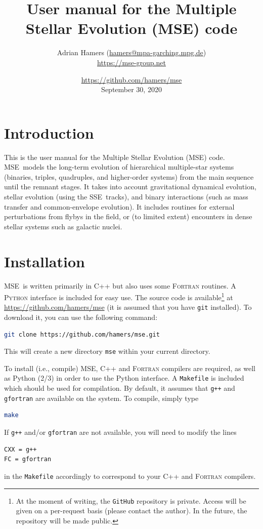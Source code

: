 \documentclass[a4paper,11pt]{article}
\title{User manual for the Multiple Stellar Evolution (MSE) code}
\author{Adrian Hamers (\url{hamers@mpa-garching.mpg.de})\\\url{https://mse-group.net}}
\date{\url{https://github.com/hamers/mse} \\ September 30, 2020}
\newcommand{\sse}{\textsc{SSE}}
\newcommand{\mse}{\textsc{MSE}}
\begin{document}
\maketitle


\tableofcontents
\clearpage

\section{Introduction}
This is the user manual for the Multiple Stellar Evolution (\mse) code. \mse~models the long-term evolution of hierarchical multiple-star systems (binaries, triples, quadruples, and higher-order systems) from the main sequence until  the remnant stages. It takes into account gravitational dynamical evolution, stellar evolution (using the \sse~tracks), and binary interactions (such as mass transfer and common-envelope evolution). It includes routines for external perturbations from flybys in the field, or (to limited extent) encounters in dense stellar systems such as galactic nuclei.


\section{Installation}
\mse~is written primarily in \textsc{C++} but also uses some \textsc{Fortran} routines. A \textsc{Python} interface is included for easy use. The source code is available\footnote{At the moment of writing, the \texttt{GitHub} repository is private. Access will be given on a per-request basis (please contact the author). In the future, the repository will be made public.} at \href{https://github.com/hamers/mse}{https://github.com/hamers/mse} (it is assumed that you have \texttt{git} installed). To download it, you can use the following command:
\begin{lstlisting}[caption={},label={code:wrap},language=bash]
git clone https://github.com/hamers/mse.git
\end{lstlisting}
This will create a new directory \texttt{mse} within your current directory. 

To install (i.e., compile) \mse, \textsc{C++} and \textsc{Fortran} compilers are required, as well as Python (2/3) in order to use the Python interface. A \texttt{Makefile} is included which should be used for compilation. By default, it assumes that \texttt{g++} and \texttt{gfortran} are available on the system. To compile, simply type
\begin{lstlisting}[caption={},label={code:wrap},language=bash]
make
\end{lstlisting}
If \texttt{g++} and/or \texttt{gfortran} are not available, you will need to modify the lines
\begin{lstlisting}[caption={},label={code:wrap},language=bash]
CXX = g++
FC = gfortran
\end{lstlisting}
in the \texttt{Makefile} accordingly to correspond to your \textsc{C++} and \textsc{Fortran} compilers. 
\end{document}
